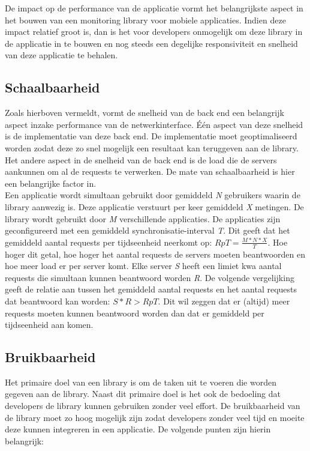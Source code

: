De impact op de performance van de applicatie vormt het belangrijkste aspect in het bouwen van een monitoring library voor mobiele applicaties. Indien deze impact relatief groot is, dan is het voor developers onmogelijk om deze library in de applicatie in te bouwen en nog steeds een degelijke responsiviteit en snelheid van deze applicatie te behalen. 

\subsection{Schaalbaarheid}
Zoals hierboven vermeldt, vormt de snelheid van de back end een belangrijk aspect inzake performance van de netwerkinterface. \'E\'en aspect van deze snelheid is de implementatie van deze back end. De implementatie moet geoptimaliseerd worden zodat deze zo snel mogelijk een resultaat kan teruggeven aan de library. Het andere aspect in de snelheid van de back end is de load die de servers aankunnen om al de requests te verwerken. De mate van schaalbaarheid is hier een belangrijke factor in. \\

Een applicatie wordt simultaan gebruikt door gemiddeld \textit{N} gebruikers waarin de library aanwezig is. Deze applicatie verstuurt per keer gemiddeld \textit{X} metingen. De library wordt gebruikt door \textit{M} verschillende applicaties. De applicaties zijn geconfigureerd met een gemiddeld synchronisatie-interval \textit{T}. Dit geeft dat het gemiddeld aantal requests per tijdseenheid neerkomt op: $RpT=\frac{M*N*X}{T}$. Hoe hoger dit getal, hoe hoger het aantal requests de servers moeten beantwoorden en hoe meer load er per server komt. Elke server \textit{S} heeft een limiet kwa aantal requests die simultaan kunnen beantwoord worden \textit{R}. De volgende vergelijking geeft de relatie aan tussen het gemiddeld aantal requests en het aantal requests dat beantwoord kan worden: $S*R > RpT$. Dit wil zeggen dat er (altijd) meer requests moeten kunnen beantwoord worden dan dat er gemiddeld per tijdseenheid aan komen.\\



\subsection{Bruikbaarheid}
Het primaire doel van een library is om de taken uit te voeren die worden gegeven aan de library. Naast dit primaire doel is het ook de bedoeling dat developers de library kunnen gebruiken zonder veel effort. De bruikbaarheid van de library moet zo hoog mogelijk zijn zodat developers zonder veel tijd en moeite deze kunnen integreren in een applicatie. De volgende punten zijn hierin belangrijk: 

